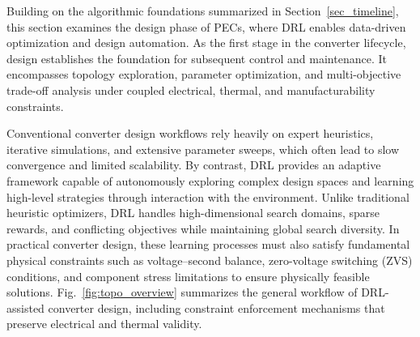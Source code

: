 Building on the algorithmic foundations summarized in Section~\ref{sec_timeline}, 
this section examines the design phase of PECs, 
where DRL enables data-driven optimization and design automation. 
As the first stage in the converter lifecycle, design establishes the foundation for subsequent control and maintenance. 
It encompasses topology exploration, parameter optimization, and multi-objective trade-off analysis under coupled electrical, thermal, and manufacturability constraints.

Conventional converter design workflows rely heavily on expert heuristics, iterative simulations, and extensive parameter sweeps, which often lead to slow convergence and limited scalability. 
By contrast, DRL provides an adaptive framework capable of autonomously exploring complex design spaces and learning high-level strategies through interaction with the environment. 
Unlike traditional heuristic optimizers, DRL handles high-dimensional search domains, sparse rewards, and conflicting objectives while maintaining global search diversity. 
In practical converter design, these learning processes must also satisfy fundamental physical constraints such as voltage–second balance, zero-voltage switching (ZVS) conditions, and component stress limitations to ensure physically feasible solutions. 
Fig.~\ref{fig:topo_overview} summarizes the general workflow of DRL-assisted converter design, including constraint enforcement mechanisms that preserve electrical and thermal validity.


